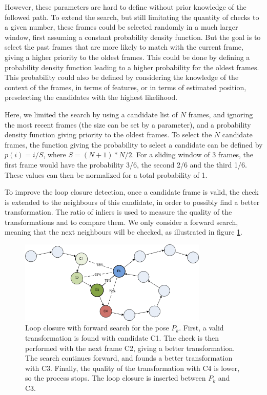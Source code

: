 However, these parameters are hard to define without prior knowledge of the followed path. To extend the search, but still limitating the quantity of checks to a given number, these frames could be selected randomly in a much larger window, first assuming a constant probability density function. But the goal is to select the past frames that are more likely to match with the current frame, giving a higher priority to the oldest frames. This could be done by defining a probability density function leading to a higher probability for the oldest frames. This probability could also be defined by considering the knowledge of the context of the frames, in terms of features, or in terms of estimated position, preselecting the candidates with the highest likelihood.

Here, we limited the search by using a candidate list of $N$ frames, and ignoring the most recent frames (the size can be set by a parameter), and a probability density function giving priority to the oldest frames. To select the $N$ candidate frames, the function giving the probability to select a candidate can be defined by $p(i) = i/S$, where $S=(N+1)*N/2$. For a sliding window of 3 frames, the first frame would have the probability 3/6, the second 2/6 and the third 1/6. These values can then be normalized for a total probability of 1.

To improve the loop closure detection, once a candidate frame is valid, the check is extended to the neighbours of this candidate, in order to possibly find a better transformation. The ratio of inliers is used to measure the quality of the transformations and to compare them. We only consider a forward search, meaning that the next neighbours will be checked, as illustrated in figure \ref{fig:lc_candidate}.

\begin{figure}[H]
\centering
 \includegraphics[width=0.8\textwidth]{figures/graph_lc_candidate_2}
\caption{Loop closure with forward search for the pose $P_k$. First, a valid transformation is found with candidate C1. The check is then performed with the next frame C2, giving a better transformation. The search continues forward, and founds a better transformation with C3. Finally, the quality of the transformation with C4 is lower, so the process stops. The loop closure is inserted between $P_k$ and C3.}
\label{fig:lc_candidate}
\end{figure}

